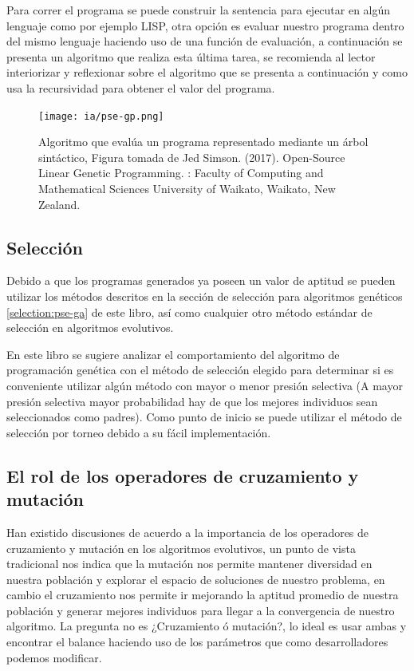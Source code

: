 \documentclass[11pt,fleqn]{book} %
\begin{document}
Para correr el programa se puede construir la sentencia para ejecutar en algún lenguaje como por ejemplo LISP, otra opción es evaluar nuestro programa dentro del mismo lenguaje haciendo uso de una función de evaluación, a continuación se presenta un algoritmo que realiza esta última tarea, se recomienda al lector interiorizar y reflexionar sobre el algoritmo que se presenta a continuación y como usa la recursividad para obtener el valor del programa.

\begin{figure}[ht]
\centering\texttt{[image: ia/pse-gp.png]}
\caption{Algoritmo que evalúa un programa representado mediante un árbol sintáctico, Figura tomada de Jed Simson. (2017). Open-Source Linear Genetic Programming. : Faculty of Computing and Mathematical Sciences University of Waikato, Waikato, New Zealand.\cite{opensourceLGP}}
\label{fig:pse-gp} 
\end{figure}

\subsection{Selección} 

Debido a que los programas generados ya poseen un valor de aptitud se pueden utilizar los métodos descritos en la sección de selección para algoritmos genéticos \ref{selection:pse-ga} de este libro, así como cualquier otro método estándar de selección en algoritmos evolutivos. 

En este libro se sugiere analizar el comportamiento del algoritmo de programación genética con el método de selección elegido para determinar si es conveniente utilizar algún método con mayor o menor presión selectiva (A mayor presión selectiva mayor probabilidad hay de que los mejores individuos sean seleccionados como padres).
Como punto de inicio se puede utilizar el método de selección por torneo debido a su fácil implementación.

\subsection{El rol de los operadores de cruzamiento y mutación} 

Han existido discusiones de acuerdo a la importancia de los operadores de cruzamiento y mutación en los algoritmos evolutivos, un punto de vista tradicional nos indica que la mutación nos permite mantener diversidad en nuestra población y explorar el espacio de soluciones de nuestro problema, en cambio el cruzamiento nos permite ir mejorando la aptitud promedio de nuestra población y generar mejores individuos para llegar a la convergencia de nuestro algoritmo. La pregunta no es ¿Cruzamiento ó mutación?, lo ideal es usar ambas y encontrar el balance haciendo uso de los parámetros que como desarrolladores podemos modificar.
\end{document}
